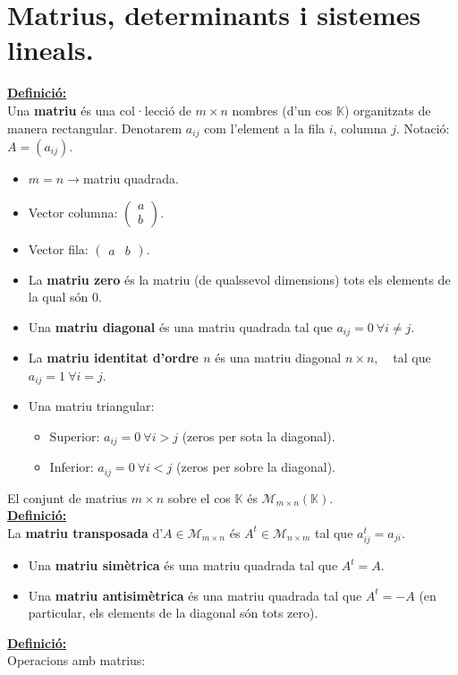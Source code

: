 \documentclass[11pt]{article}
\newcommand{\fieldk}{\mathbb{K}}
\newcommand{\definicio}{\underline{\textbf{Definició:}} \\}
\DeclareMathOperator{\idn}{Id_n}
\begin{document}
\section{Matrius, determinants i sistemes lineals.}
\definicio Una \textbf{matriu} és una col·lecció de $m\times n$ nombres (d'un cos $\fieldk$) organitzats de manera rectangular. Denotarem $a_{ij}$ com l'element a la fila $i$, columna $j$. Notació: $A=(a_{ij})$.
\begin{itemize}
	\item $m=n\rightarrow$matriu quadrada.
	\item Vector columna: $\begin{pmatrix}
	a\\ b
	\end{pmatrix}$.
	\item Vector fila: $\begin{pmatrix}
	a & b
	\end{pmatrix}$.
	\item La \textbf{matriu zero} és la matriu (de qualssevol dimensions) tots els elements de la qual són 0.
	\item Una \textbf{matriu diagonal} és una matriu quadrada tal que $a_{ij}=0\ \forall i\neq j$.
	\item La \textbf{matriu identitat d'ordre $n$} és una matriu diagonal $n\times n$, $\idn$ tal que $a_{ij}=1\ \forall i=j$.
	\item Una matriu triangular:
	\begin{itemize}
		\item Superior: $a_{ij}=0\ \forall i>j$ (zeros per sota la diagonal).
		\item Inferior: $a_{ij}=0\ \forall i<j$ (zeros per sobre la diagonal).
	\end{itemize}
\end{itemize}
El conjunt de matrius $m\times n$ sobre el cos $\fieldk$ és $\mathcal{M}_{m\times n}(\fieldk)$.\\
\definicio La \textbf{matriu transposada} d'$A\in\mathcal{M}_{m\times n}$ és $A^t\in\mathcal{M}_{n\times m}$ tal que $a^t_{ij}=a_{ji}$.
\begin{itemize}
	\item Una \textbf{matriu simètrica} és una matriu quadrada tal que $A^t=A$.
	\item Una \textbf{matriu antisimètrica} és una matriu quadrada tal que $A^t=-A$ (en particular, els elements de la diagonal són tots zero).
\end{itemize}
\definicio Operacions amb matrius:
\end{document}
